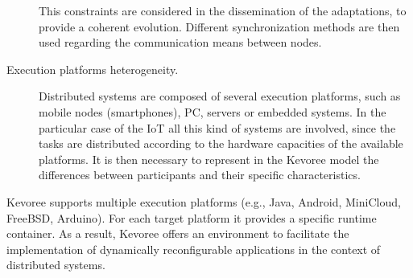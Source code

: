 \begin{description}
	This constraints are considered in the dissemination of the adaptations, to provide a coherent evolution.
	Different synchronization methods are then used regarding the communication means between nodes.
	\item [Execution platforms heterogeneity.] Distributed systems are composed of several execution platforms, such as mobile nodes (smartphones), PC, servers or embedded systems. In the particular case of the IoT all this kind of systems are involved, since the tasks are distributed according to the hardware capacities of the available platforms.
	It is then necessary to represent in the Kevoree model the differences between participants and their specific characteristics.
\end{description}

Kevoree supports multiple execution platforms (e.g., Java, Android, MiniCloud, FreeBSD, Arduino).
For each target platform it provides a specific runtime container.
As a result, Kevoree offers an environment to facilitate the implementation of dynamically reconfigurable applications in the context of distributed systems. %


